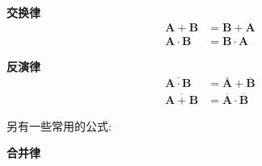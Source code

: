 \textbf{交换律}
\begin{align}
	\boldsymbol{A}+\boldsymbol{B}&=\boldsymbol{B}+\boldsymbol{A}\\
	\boldsymbol{A}\cdot \boldsymbol{B}&=\boldsymbol{B}\cdot \boldsymbol{A}
\end{align}

\textbf{反演律}
\begin{align}
	\overline{\boldsymbol{A}\cdot \boldsymbol{B}}&=\overline{\boldsymbol{A}}+\overline{\boldsymbol{B}}\\
	\overline{\boldsymbol{A}+\boldsymbol{B}}&=\overline{\boldsymbol{A}}\cdot \overline{\boldsymbol{B}}
\end{align}

另有一些常用的公式:

\textbf{合并律}